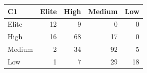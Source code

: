 \begin{tabular}{lrrrr}
\toprule
C1 & Elite & High & Medium & Low \\
\midrule
Elite & 12 & 9 & 0 & 0 \\
High & 16 & 68 & 17 & 0 \\
Medium & 2 & 34 & 92 & 5 \\
Low & 1 & 7 & 29 & 18 \\
\bottomrule
\end{tabular}
